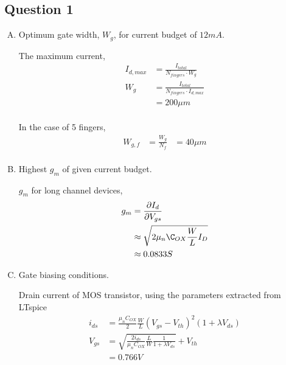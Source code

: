 \documentclass{article}
\begin{document}
\subsection{Question 1}
\label{sec:org8215cb0}
\begin{enumerate}[A.]
\item Optimum gate width, \(W_{g}\), for current budget of \(12mA\).

The maximum current,
\begin{equation*}
\begin{aligned}
I_{d,max} &= \frac{I_{total}}{N_{fingers} \cdot{} W_{g}} \\
W_{g} &= \frac{I_{total}}{N_{fingers} \cdot{} I_{d,max}} \\
&= 200 \mu{}m \\
\end{aligned}
\end{equation*}

In the case of 5 fingers,
\begin{equation*}
\begin{aligned}
W_{g,f} &= \frac{W_{g}}{N_{f}}
&= 40 \mu{}m \\
\end{aligned}
\end{equation*}

\item Highest \(g_{m}\) of given current budget.

\(g_{m}\) for long channel devices,
\begin{equation*}
\begin{aligned}
g_{m} &= \frac{\partial I_{d}}{\partial V_{gs}} \\
&\approx \sqrt{2\mu_{n}\C_{OX}\frac{W}{L}I_{D}} \\
&\approx 0.0833 S \\
\end{aligned}
\end{equation*}

\item Gate biasing conditions.

Drain current of MOS transistor, using the parameters extracted from LTspice
\begin{equation*}
\begin{aligned}
i_{ds} &= \frac{\mu_{n}C_{OX}}{2}\frac{W}{L}(V_{gs} - V_{th})^{2}(1 + \lambda{}V_{ds}) \\
V_{gs} &= \sqrt{\frac{2i_{ds}}{\mu_{n}C_{OX}}\frac{L}{W}\frac{1}{1 + \lambda{}V_{ds}}} + V_{th} \\
&= 0.766 V \\
\end{aligned}
\end{equation*}


\end{enumerate}
\end{document}
